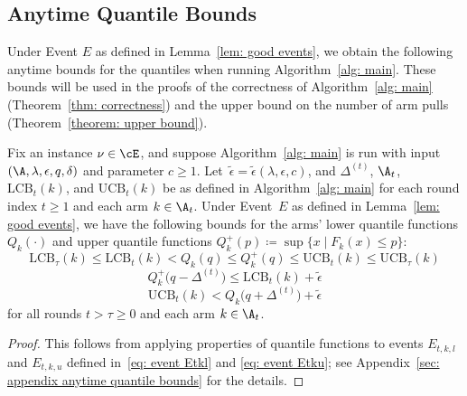 \subsection{Anytime Quantile Bounds}
Under Event $E$  as defined in Lemma~\ref{lem: good events}, we obtain the following anytime bounds for the quantiles when running Algorithm~\ref{alg: main}. 
These bounds will be used in the proofs of the correctness of Algorithm~\ref{alg: main} (Theorem~\ref{thm: correctness}) and the upper bound on the number of arm pulls (Theorem~\ref{theorem: upper bound}).

\begin{lemma}
\label{lem: quantile anytime bound}
    Fix an instance $\nu \in \cE$, and suppose Algorithm~\ref{alg: main} is run with input $(\A, \lambda, \epsilon, q, \delta)$ and parameter $c \ge 1$.
    Let~$\tilde{\epsilon} = \tilde{\epsilon}(\lambda, \epsilon, c)$,
    and $\Delta^{(t)}$, $\A_t$, $\mathrm{LCB}_t(k)$, and $\mathrm{UCB}_t(k)$ be as defined in Algorithm~\ref{alg: main} for each round index $t \ge 1$ and each arm $k \in \A_t$.    
    Under Event~$E$ as defined in Lemma~\ref{lem: good events}, we have the following bounds for the 
    arms' lower quantile functions $Q_k(\cdot )$ and upper quantile functions
     $Q^+_k(p) \coloneqq \sup \{ x \mid F_k(x) \le p \} $:
    \begin{equation}
    \label{eq: quantile anytime bound}
           \mathrm{LCB}_{\tau}(k)
        \le \mathrm{LCB}_t(k)
        < Q_k(q) \le  Q^+_k(q)
        \le \mathrm{UCB}_t(k)
        \le \mathrm{UCB}_{\tau}(k)
    \end{equation}
    \begin{equation}
    \label{eq: lower approx quantile anytime bound}
       Q^+_k\big(q -  \Delta^{(t)} \big)
        \le \mathrm{LCB}_t(k) + \tilde{\epsilon}
    \end{equation}
    \begin{equation}
    \label{eq: upper approx quantile anytime bound}
        \mathrm{UCB}_t(k) 
        <
         Q_k\big(q + \Delta^{(t)} \big) + \tilde{\epsilon}
    \end{equation}
    for all rounds $t  > \tau \ge 0$ and each arm $k \in \A_t$.
\end{lemma}
\begin{proof}
    This follows from applying properties of quantile functions to events $E_{t, k, l}$ and $E_{t, k, u}$ defined in~\eqref{eq: event Etkl} and \eqref{eq: event Etku}; see Appendix~\ref{sec: appendix anytime quantile bounds} for the details.
\end{proof}

